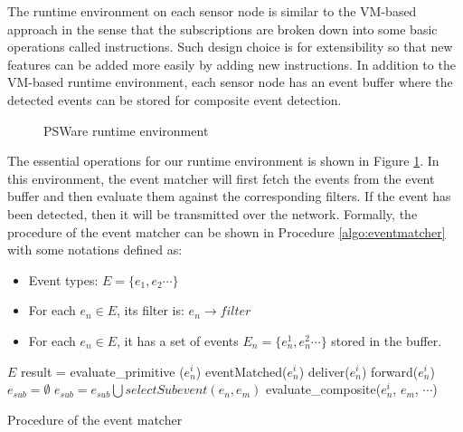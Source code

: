 The runtime environment on each sensor node is similar to the VM-based approach \cite{mate} in the sense that the subscriptions are broken down into some basic operations called instructions. Such design choice is for extensibility so that new features can be added more easily by adding new instructions. In addition to the VM-based runtime environment, each sensor node has an event buffer where the detected events can be stored for composite event detection.

\begin{figure}
\centering
{}
\caption{PSWare runtime environment}
\label{fig:eventdetectionframework2}
\end{figure}
The essential operations for our runtime environment is shown in Figure \ref{fig:eventdetectionframework2}. In this environment, the event matcher will first fetch the events from the event buffer and then evaluate them against the corresponding filters. If the event has been detected, then it will be transmitted over the network. Formally, the procedure of the event matcher can be shown in Procedure \ref{algo:eventmatcher} with some notations defined as:
\begin{itemize}
\item Event types: \(E=\{e_1, e_2 \cdots \}\)
\item For each \(e_n\in E\), its filter is: \(e_n\rightarrow filter\)
\item For each \(e_n\in E\), it has a set of events \(E_n=\{e_n^1, e_n^2 \cdots \}\) stored in the buffer.
\end{itemize}

\begin{algorithm}
\begin{algorithmic}
\REQUIRE \(E\)
				\STATE result = evaluate\_primitive (\(e_n^i\))
					\STATE eventMatched(\(e_n^i\))
						\STATE deliver(\(e_n^i\))
					\ELSE
						\STATE forward(\(e_n^i\))
					\ENDIF
				\ENDIF
			\ELSE
				\STATE \(e_{sub} = \emptyset \)
					\STATE \(e_{sub} = e_{sub}\bigcup selectSubevent (e_n, e_m)\)
				\ENDFOR
					\STATE evaluate\_composite(\(e_n^i\), \(e_m\), \(\cdots \))
				\ENDFOR
			\ENDIF
		\ENDFOR
	\ENDFOR
\end{algorithmic}
\caption{Procedure of the event matcher}
\label{algo:eventmatcher}
\end{algorithm}

